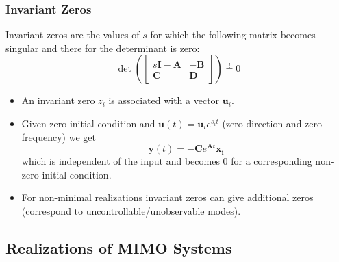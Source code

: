 \subsubsection{Invariant Zeros}

Invariant zeros are the values of $s$ for which the following matrix becomes singular and there for the determinant is zero:
\begin{equation*}
    \det \left(\begin{bmatrix}
            s\mathbf{I}-\mathbf{A} & -\mathbf{B} \\
            \mathbf{C}             & \mathbf{D}
        \end{bmatrix}\right) \overset{!}{=}0
\end{equation*}



\begin{itemize}
    \item An invariant zero $z_i$ is associated with a vector $\mathbf{u}_i$.
    \item Given zero initial condition and $\mathbf{u}(t)=\mathbf{u}_i e^{s_i t}$ (zero direction and zero frequency) we get
          \begin{equation*}
              \mathbf{y}(t)=-\mathbf{C}e^{\mathbf{A}t}\mathbf{x_i}
          \end{equation*} which is independent of the input and becomes $0$ for a corresponding non-zero initial condition.
    \item For non-minimal realizations invariant zeros can give additional zeros (correspond to uncontrollable/unobservable modes).
\end{itemize}


\subsection{Realizations of MIMO Systems}
